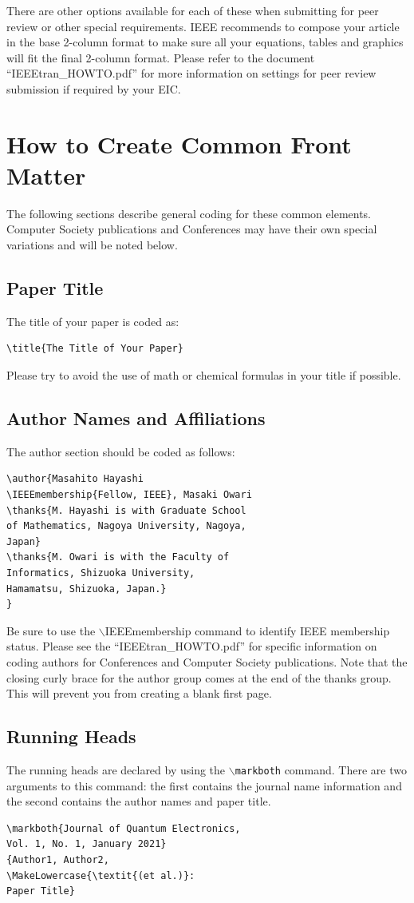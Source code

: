 \documentclass[lettersize,journal]{IEEEtran}
\begin{document}
There are other options available for each of these when submitting for peer review or other special requirements. IEEE recommends to compose your article in the base 2-column format to make sure all your equations, tables and graphics will fit the final 2-column format. Please refer to the document ``IEEEtran\_HOWTO.pdf'' for more information on settings for peer review submission if required by your EIC.

\section{How to Create Common Front Matter}
\noindent The following sections describe general coding for these common elements. Computer Society publications and Conferences may have their own special variations and will be noted below.
\subsection{Paper Title}
\noindent The title of your paper is coded as:

\begin{verbatim}
\title{The Title of Your Paper}
\end{verbatim}

\noindent Please try to avoid the use of math or chemical formulas in your title if possible.

\subsection{Author Names and Affiliations}
\noindent The author section should be coded as follows:
\begin{verbatim}
\author{Masahito Hayashi 
\IEEEmembership{Fellow, IEEE}, Masaki Owari
\thanks{M. Hayashi is with Graduate School 
of Mathematics, Nagoya University, Nagoya, 
Japan}
\thanks{M. Owari is with the Faculty of 
Informatics, Shizuoka University, 
Hamamatsu, Shizuoka, Japan.}
}
\end{verbatim}
Be sure to use the $\backslash$IEEEmembership command to identify IEEE membership status.
Please see the ``IEEEtran\_HOWTO.pdf'' for specific information on coding authors for Conferences and Computer Society publications. Note that the closing curly brace for the author group comes at the end of the thanks group. This will prevent you from creating a blank first page.

\subsection{Running Heads}
\noindent The running heads are declared by using the $\backslash${\tt{markboth}} command. There are two arguments to this command: the first contains the journal name information and the second contains the author names and paper title.
\begin{verbatim}
\markboth{Journal of Quantum Electronics, 
Vol. 1, No. 1, January 2021}
{Author1, Author2, 
\MakeLowercase{\textit{(et al.)}: 
Paper Title}
\end{verbatim}
\end{document}
